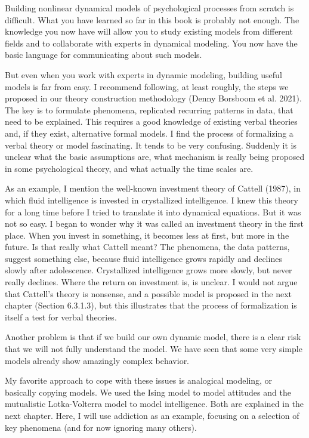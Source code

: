 \documentclass[
  letterpaper,
]{scrbook}
\begin{document}
Building nonlinear dynamical models of psychological processes from
scratch is difficult. What you have learned so far in this book is
probably not enough. The knowledge you now have will allow you to study
existing models from different fields and to collaborate with experts in
dynamical modeling. You now have the basic language for communicating
about such models.

But even when you work with experts in dynamic modeling, building useful
models is far from easy. I recommend following, at least roughly, the
steps we proposed in our theory construction methodology (Denny Borsboom
et al. 2021). The key is to formulate phenomena, replicated recurring
patterns in data, that need to be explained. This requires a good
knowledge of existing verbal theories and, if they exist, alternative
formal models. I find the process of formalizing a verbal theory or
model fascinating. It tends to be very confusing. Suddenly it is unclear
what the basic assumptions are, what mechanism is really being proposed
in some psychological theory, and what actually the time scales are.

As an example, I mention the well-known investment theory of Cattell
(1987), in which fluid intelligence is invested in crystallized
intelligence. I knew this theory for a long time before I tried to
translate it into dynamical equations. But it was not so easy. I began
to wonder why it was called an investment theory in the first place.
When you invest in something, it becomes less at first, but more in the
future. Is that really what Cattell meant? The phenomena, the data
patterns, suggest something else, because fluid intelligence grows
rapidly and declines slowly after adolescence. Crystallized intelligence
grows more slowly, but never really declines. Where the return on
investment is, is unclear. I would not argue that Cattell's theory is
nonsense, and a possible model is proposed in the next chapter (Section
6.3.1.3), but this illustrates that the process of formalization is
itself a test for verbal theories.

Another problem is that if we build our own dynamic model, there is a
clear risk that we will not fully understand the model. We have seen
that some very simple models already show amazingly complex behavior.

My favorite approach to cope with these issues is analogical modeling,
or basically copying models. We used the Ising model to model attitudes
and the mutualistic Lotka-Volterra model to model intelligence. Both are
explained in the next chapter. Here, I will use addiction as an example,
focusing on a selection of key phenomena (and for now ignoring many
others).
\end{document}
